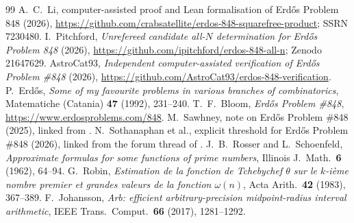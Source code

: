 \documentclass[11pt]{amsart}
\theoremstyle{definition}
\theoremstyle{remark}
\begin{document}
\begin{thebibliography}{99}
 A.~C.~Li, computer-assisted proof and Lean formalisation of Erd\H{o}s Problem 848 (2026),
  \url{https://github.com/crabsatellite/erdos-848-squarefree-product}; SSRN 7230480.
 I.~Pitchford, \emph{Unrefereed candidate all-$N$ determination for Erd\H{o}s Problem 848}
  (2026), \url{https://github.com/ipitchford/erdos-848-all-n}; Zenodo 21647629.
 AstroCat93, \emph{Independent computer-assisted verification of Erd\H{o}s Problem \#848}
  (2026), \url{https://github.com/AstroCat93/erdos-848-verification}.
 P.~Erd\H{o}s, \emph{Some of my favourite problems in various branches of combinatorics},
  Matematiche (Catania) \textbf{47} (1992), 231--240.
 T.~F.~Bloom, \emph{Erd\H{o}s Problem \#848}, \url{https://www.erdosproblems.com/848}.
 M.~Sawhney, note on Erd\H{o}s Problem \#848 (2025), linked from \cite{EP848}.
 N.~Sothanaphan et al., explicit threshold for Erd\H{o}s Problem \#848 (2026), linked from the
  forum thread of \cite{EP848}.
 J.~B.~Rosser and L.~Schoenfeld, \emph{Approximate formulas for some functions of prime numbers},
  Illinois J.\ Math.\ \textbf{6} (1962), 64--94.
 G.~Robin, \emph{Estimation de la fonction de Tchebychef $\theta$ sur le $k$-i\`eme nombre premier
  et grandes valeurs de la fonction $\omega(n)$}, Acta Arith.\ \textbf{42} (1983), 367--389.
 F.~Johansson, \emph{Arb: efficient arbitrary-precision midpoint-radius interval arithmetic},
  IEEE Trans.\ Comput.\ \textbf{66} (2017), 1281--1292.
\end{thebibliography}
\end{document}
